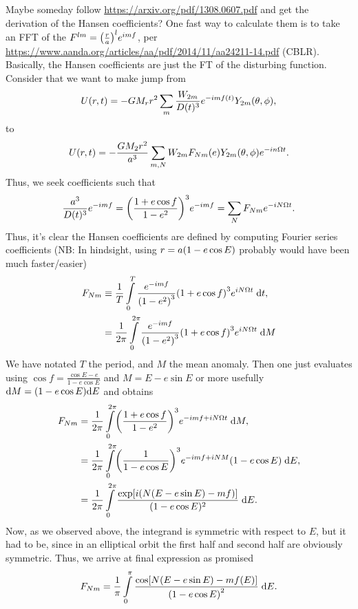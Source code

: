 \documentclass[11pt,
        usenames, %
        dvipsnames %
    ]{article}
\DeclarePairedDelimiter\p{\lparen}{\rparen}
\DeclarePairedDelimiter\s{\lbrack}{\rbrack}
\begin{document}
Maybe someday follow \url{https://arxiv.org/pdf/1308.0607.pdf} and get the
derivation of the Hansen coefficients? One fast way to calculate them is to take
an FFT of the $F^{lm} = \p*{\frac{r}{a}}^l e^{imf}$, per
\url{https://www.aanda.org/articles/aa/pdf/2014/11/aa24211-14.pdf}%
(CBLR). Basically, the Hansen coefficients are just the FT of the disturbing
function. Consider that we want to make jump from
\begin{equation}
    U(r, t) = -GM_rr^2 \sum\limits_m \frac{W_{2m}}{D(t)^3}e^{-imf(t)}
        Y_{2m}\p*{\theta, \phi},
\end{equation}
to
\begin{equation}
    U(r, t) = -\frac{GM_2r^2}{a^3}\sum\limits_{m, N} W_{2m}
        F_{Nm}(e) Y_{2m}\p*{\theta, \phi} e^{-in\Omega t}.
\end{equation}
Thus, we seek coefficients such that
\begin{equation}
    \frac{a^3}{D(t)^3} e^{-imf} = \p*{\frac{1 + e\cos f}{1 - e^2}}^3
            e^{-imf}
        = \sum\limits_N F_{Nm} e^{-iN\Omega t}.
\end{equation}
Thus, it's clear the Hansen coefficients are defined by computing Fourier series
coefficients (NB\@: In hindsight, using $r = a\p*{1 - e\cos E}$ probably would
have been much faster/easier)
\begin{align}
    F_{Nm} &\equiv \frac{1}{T}\int\limits_{0}^T
        \frac{e^{-imf}}{\p*{1 - e^2}^3}\p*{1 + e\cos f}^3 e^{iN\Omega t}
            \;\mathrm{d}t,\\
        &= \frac{1}{2\pi} \int\limits_{0}^{2\pi}
            \frac{e^{-imf}}{\p*{1 - e^2}^3}\p*{1 + e\cos f}^3 e^{iN\Omega t}
                \;\mathrm{d}M
\end{align}
We have notated $T$ the period, and $M$ the mean anomaly. Then one just
evaluates using $\cos f = \frac{\cos E - e}{1 - e\cos E}$ and $M = E - e\sin E$
or more usefully $\mathrm{d}M = \p*{1 - e\cos E}\mathrm{d}E$ and obtains
\begin{align}
    F_{Nm} &= \frac{1}{2\pi}\int\limits_0^{2\pi}
            \p*{\frac{1 + e\cos f}{1 - e^2}}^3 e^{-imf + iN\Omega t}
                \;\mathrm{d}M,\\
        &= \frac{1}{2\pi}\int\limits_0^{2\pi}
            \p*{\frac{1}{1 - e\cos E}}^3 e^{-imf + iN M} \p*{1 - e\cos E}
                \;\mathrm{d}E,\\
        &= \frac{1}{2\pi}\int\limits_0^{2\pi}
            \frac{\exp\s*{i\p*{N\p*{E - e\sin E} - mf}}}{(1 - e \cos E)^2}
                \;\mathrm{d}E.
\end{align}
Now, as we observed above, the integrand is symmetric with respect to $E$, but
it had to be, since in an elliptical orbit the first half and second half are
obviously symmetric. Thus, we arrive at final expression as promised
\begin{equation}
    F_{Nm} = \frac{1}{\pi}\int\limits_{0}^{\pi}
        \frac{\cos\s*{N\p*{E - e\sin E} - mf(E)}}
            {\p*{1 - e\cos E}^2}\;\mathrm{d}E.
\end{equation}
\end{document}
